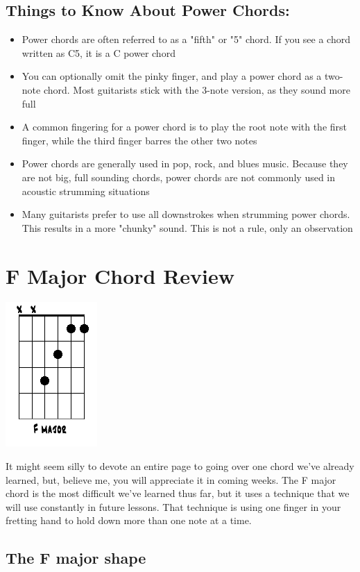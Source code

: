 \subsection{Things to Know About Power Chords:}
\begin{itemize}
\item Power chords are often referred to as a "fifth" or "5" chord. If you see a chord written as C5, it is a C power chord
\item You can optionally omit the pinky finger, and play a power chord as a two-note chord. Most guitarists stick with the 3-note version, as they sound more full
\item A common fingering for a power chord is to play the root note with the first finger, while the third finger barres the other two notes
\item Power chords are generally used in pop, rock, and blues music. Because they are not big, full sounding chords, power chords are not commonly used in acoustic strumming situations
\item Many guitarists prefer to use all downstrokes when strumming power chords. This results in a more "chunky" sound. This is not a rule, only an observation
\end{itemize}

\section{F Major Chord Review}
\includegraphics{partfour/chord_fmajor_open.png}

It might seem silly to devote an entire page to going over one chord we've already learned, but, believe me, you will appreciate it in coming weeks. The F major chord is the most difficult we've learned thus far, but it uses a technique that we will use constantly in future lessons. That technique is using one finger in your fretting hand to hold down more than one note at a time.

\subsection{The F major shape}

